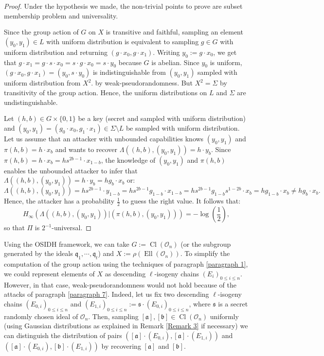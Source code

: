 \documentclass[a4paper,10pt]{report}
\theoremstyle{definition}
\theoremstyle{plain}
\theoremstyle{definition}
\newcommand{\mO}{\mathcal{O}}
\renewcommand{\(}{\left(}
\renewcommand{\)}{\right)}
\newcommand{\mf}[1]{\mathfrak{#1}}
\DeclareMathOperator{\Cl}{Cl}
\DeclareMathOperator{\Ell}{Ell}
\begin{document}
\begin{proof}
Under the hypothesis we made, the non-trivial points to prove are subset membership problem and universality.  

Since the group action of $G$ on $X$ is transitive and faithful, sampling an element $(y_0,y_1)\in L$ with uniform distribution is equivalent to sampling $g\in G$ with uniform distribution and returning $(g\cdot x_0, g\cdot x_1)$. Writing $y_0:=g\cdot x_0$, we get that $g\cdot x_1=g\cdot s\cdot x_0=s\cdot g\cdot x_0=s\cdot y_0$ because $G$ is abelian. Since $y_0$ is uniform, $(g\cdot x_0, g\cdot x_1)=(y_0,s\cdot y_0)$ is indistinguishable from $(y_0,y_1)$ sampled with uniform distribution from $X^2$. by weak-pseudorandomness. But $X^2=\Sigma$ by transitivity of the group action. Hence, the uniform distributions on $L$ and $\Sigma$ are undistinguishable.

Let $(h,b)\in G\times\{0,1\}$ be a key (secret and sampled with uniform distribution) and $(y_0,y_1)=(g_0\cdot x_0, g_1\cdot x_1)\in \Sigma\setminus L$ be sampled with uniform distribution. Let us assume that an attacker with unbounded capabilities knows $(y_0,y_1)$ and $\pi(h,b)=h\cdot x_b$ and wants to recover $\Lambda((h,b),(y_0,y_1))=h\cdot y_b$. Since $\pi(h,b)=h\cdot x_b=hs^{2b-1}\cdot x_{1-b}$, the knowledge of $(y_0,y_1)$ and $\pi(h,b)$ enables the unbounded attacker to infer that $\Lambda((h,b),(y_0,y_1))=h\cdot y_b=hg_b\cdot x_b$ or:
\[\Lambda((h,b),(y_0,y_1))=hs^{2b-1}\cdot y_{1-b}=hs^{2b-1}g_{1-b}\cdot x_{1-b}=hs^{2b-1}g_{1-b}s^{1-2b}\cdot x_b=hg_{1-b}\cdot x_b\neq hg_b\cdot x_b.\]
Hence, the attacker has a probability $\frac{1}{2}$ to guess the right value. It follows that:
\[H_\infty(\Lambda((h,b),(y_0,y_1))|(\pi(h,b),(y_0,y_1)))=-\log\(\frac{1}{2}\),\]
so that $\Pi$ is $2^{-1}$-universal.
\end{proof}

Using the OSIDH framework, we can take $G:=\Cl(\mO_n)$ (or the subgroup generated by the ideals $\mf{q}_1, \cdots, \mf{q}_t$) and $X:=\rho(\Ell(\mO_n))$. To simplify the computation of the group action using the techniques of paragraph \ref{paragraph 1}, we could represent elements of $X$ as descending $\ell$-isogeny chains $(E_i)_{0\leq i\leq n}$. However, in that case, weak-pseudorandomness would not hold because of the attacks of paragraph \ref{paragraph 7}.  Indeed, let us fix two descending $\ell$-isogeny chains $(E_{0,i})_{0\leq i\leq n}$ and $(E_{1,i})_{0\leq i\leq n}:=\mf{s}\cdot (E_{0,i})_{0\leq i\leq n}$, where $\mf{s}$ is a secret randomly chosen ideal of $\mO_n$. Then, sampling $[\mf{a}],[\mf{b}]\in\Cl(\mO_n)$ uniformly (using Gaussian distributions as explained in Remark \ref{Remark 3} if necessary) we can distinguish the distribution of pairs $([\mf{a}]\cdot(E_{0,i}),[\mf{a}]\cdot(E_{1,i}))$ and $([\mf{a}]\cdot(E_{0,i}),[\mf{b}]\cdot(E_{1,i}))$ by recovering $[\mf{a}]$ and $[\mf{b}]$. 
\end{document}
